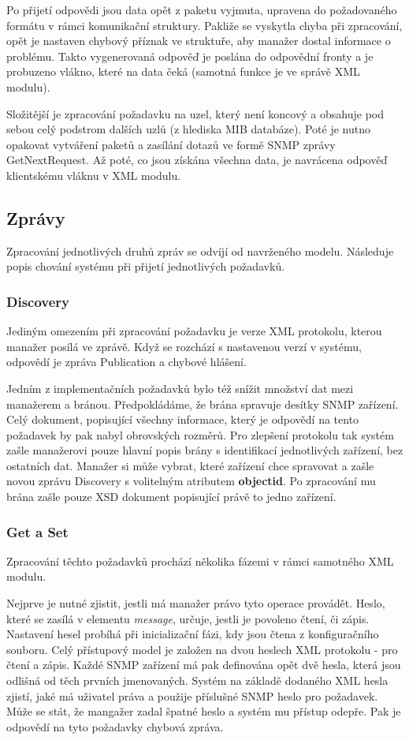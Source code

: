 Po přijetí odpovědi jsou data opět z paketu vyjmuta, upravena do požadovaného formátu v rámci komunikační struktury. Pakliže se vyskytla chyba při zpracování, opět
je nastaven chybový příznak ve struktuře, aby manažer dostal informace o problému. Takto vygenerovaná odpověď je poslána do odpovědní fronty a je probuzeno vlákno, které na
data čeká (samotná funkce je ve správě XML modulu).

Složitější je zpracování požadavku na uzel, který není koncový a obsahuje pod sebou celý podstrom dalších uzlů (z hlediska MIB databáze). Poté je nutno opakovat
vytváření paketů a zasílání dotazů ve formě SNMP zprávy GetNextRequest. Až poté, co jsou získána všechna data, je navrácena odpověď klientskému vláknu v XML modulu.


\subsection{Zprávy}
Zpracování jednotlivých druhů zpráv se odvíjí od navrženého modelu. Následuje popis chování systému při přijetí jednotlivých požadavků.

\subsubsection*{Discovery}
Jediným omezením při zpracování požadavku je verze XML protokolu, kterou manažer posílá ve zprávě. Když se rozchází s nastavenou 
verzí v systému, odpovědí je zpráva Publication a chybové hlášení.

Jedním z implementačních požadavků bylo též snížit množství dat mezi manažerem a bránou. Předpokládáme, že brána spravuje
desítky SNMP zařízení. Celý dokument, popisující všechny informace, který je odpovědí na tento požadavek by pak nabyl
obrovských rozměrů. Pro zlepšení protokolu tak systém zašle manažerovi pouze hlavní popis brány s identifikací jednotlivých zařízení, bez ostatních dat.
Manažer si může vybrat, které zařízení chce spravovat a zašle novou zprávu Discovery s volitelným atributem \textbf{objectid}. Po zpracování
mu brána zašle pouze XSD dokument popisující právě to jedno zařízení.

\subsubsection*{Get a Set}
Zpracování těchto požadavků prochází několika fázemi v rámci samotného XML modulu.

Nejprve je nutné zjistit, jestli má manažer právo tyto operace provádět. Heslo, které se zasílá v elementu \textit{message}, určuje, jestli je
povoleno čtení, či zápis. Nastavení hesel probíhá při inicializační fázi, kdy jsou čtena z konfiguračního souboru. Celý přístupový model je
založen na dvou heslech XML protokolu - pro čtení a zápis. Každé SNMP zařízení má pak definována opět dvě hesla, která jsou odlišná od těch prvních jmenovaných.
Systém na základě dodaného XML hesla zjistí, jaké má uživatel práva a použije příslušné SNMP heslo pro požadavek. Může se stát, že mangažer zadal
špatné heslo a systém mu přístup odepře. Pak je odpovědí na tyto požadavky chybová zpráva.

